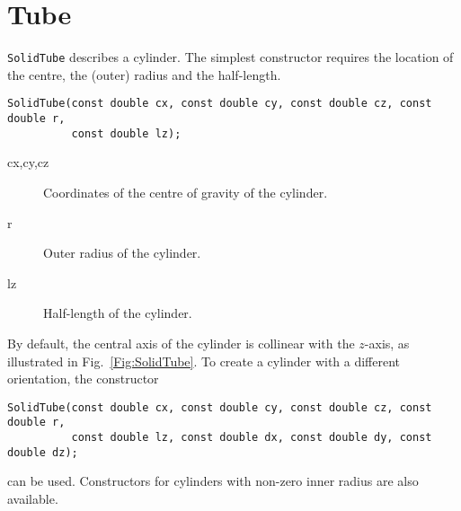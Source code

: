 \section{Tube}
\texttt{SolidTube} describes a cylinder. The simplest constructor requires
the location of the centre, the (outer) radius and the half-length. 
\begin{lstlisting}
SolidTube(const double cx, const double cy, const double cz, const double r,
          const double lz);
\end{lstlisting}
\begin{description}
\item[cx,cy,cz] Coordinates of the centre of gravity of the cylinder.
\item[r] Outer radius of the cylinder.
\item[lz] Half-length of the cylinder.
\end{description}
By default, the central axis of the cylinder is collinear with the $z$-axis,
 as illustrated in Fig.~\ref{Fig:SolidTube}. 
To create a cylinder with a different orientation, the constructor
\begin{lstlisting}
SolidTube(const double cx, const double cy, const double cz, const double r,
          const double lz, const double dx, const double dy, const double dz);
\end{lstlisting} 
can be used. 
Constructors for cylinders with non-zero inner radius are also available.

